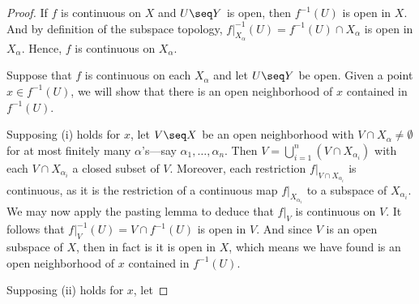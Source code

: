 \documentclass[12pt]{article}
\begin{document}
\begin{proof}
    If $f$ is continuous on $X$ and $U \seq Y$ is open, then $f^{-1}(U)$ is open in $X$.
    And by definition of the subspace topology, $f|_{X_\alpha}^{-1}(U) = f^{-1}(U) \cap X_\alpha$ is open in $X_\alpha$.
    Hence, $f$ is continuous on $X_\alpha$.

    Suppose that $f$ is continuous on each $X_\alpha$ and let $U \seq Y$ be open.
    Given a point $x \in f^{-1}(U)$, we will show that there is an open neighborhood of $x$ contained in $f^{-1}(U)$.

    Supposing (i) holds for $x$, let $V \seq X$ be an open neighborhood with $V \cap X_\alpha \ne \emptyset$ for at most finitely many $\alpha$'s---say $\alpha_1, \dots, \alpha_n$.
    Then $V = \bigcup_{i=1}^{n} (V \cap X_{\alpha_i})$ with each $V \cap X_{\alpha_i}$ a closed subset of $V$.
    Moreover, each restriction $f|_{V \cap X_{\alpha_i}}$ is continuous, as it is the restriction of a continuous map $f|_{X_{\alpha_i}}$ to a subspace of $X_{\alpha_i}$.
    We may now apply the pasting lemma to deduce that $f|_V$ is continuous on $V$.
    It follows that $f|_V^{-1}(U) = V \cap f^{-1}(U)$ is open in $V$.
    And since $V$ is an open subspace of $X$, then in fact is it is open in $X$, which means we have found is an open neighborhood of $x$ contained in $f^{-1}(U)$.

    Supposing (ii) holds for $x$, let
\end{proof}
\end{document}
